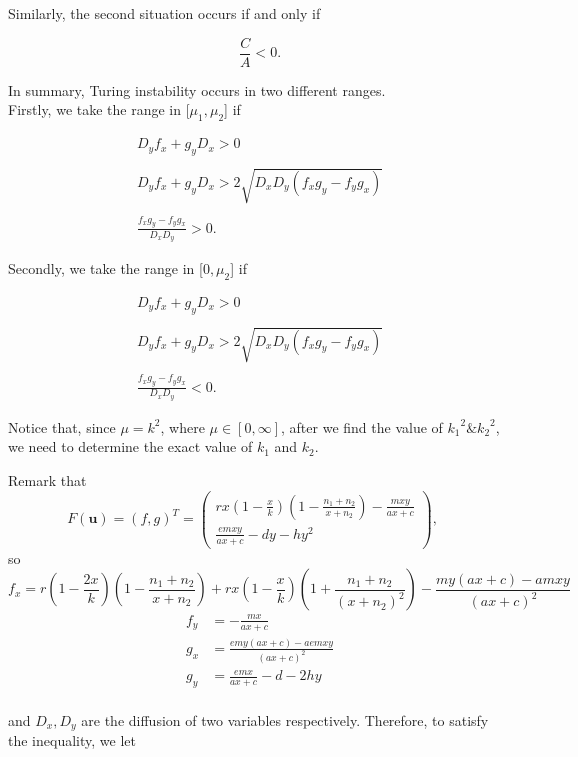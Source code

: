 \documentclass[12pt]{article}
\begin{document}
\noindent Similarly, the second situation occurs if and only if

$$\dfrac{C}{A}<0.
$$
\vspace{12pt}

\noindent In summary, Turing instability occurs in two different ranges.\\
Firstly, we take the range in [$\mu_1,\mu_2$] if
\vspace{12pt}

$$
\begin{array}{c}D_y f_x+g_y D_x>0\\ \\ D_y f_x +g_y D_x>2\sqrt{D_x D_y(f_x g_y-f_y g_x)}\\ \\ \frac{f_x g_y -f_y g_x}{D_x D_y}>0.\end{array}
$$
\vspace{12pt}

\noindent Secondly, we take the range in [$0,\mu_2$] if

$$
\begin{array}{c}D_y f_x+g_y D_x>0\\ \\ D_y f_x +g_y D_x>2\sqrt{D_x D_y(f_x g_y-f_y g_x)}\\ \\ \frac{f_x g_y -f_y g_x}{D_x D_y}<0.\end{array}
$$
\vspace{12pt}

\noindent Notice that, since $\mu = k^2$, where $\mu\in[0,\infty]$, after we find the value of ${k_1}^2\&{k_2}^2$, we need to determine the exact value of $k_1$ and $k_2$.
\vspace{12pt}

\noindent Remark that
$$
F(\boldsymbol{u})=(f,g)^T=\begin{pmatrix}rx\left(1-\frac{x}{k}\right)\left(1-\frac{n_1+n_2}{x+n_2}\right)-\frac{mxy}{ax+c}\\ \frac{emxy}{ax+c}-dy-hy^2\end{pmatrix},\quad
$$
so
$$
f_x=r\left(1-\dfrac{2x}{k}\right)\left(1-\dfrac{{n_1+n_2}}{{x+n_2}}\right)+rx\left({1-\dfrac{x}{k}}\right)\left({1+\dfrac{n_1+n_2}{(x+n_2)^2}}\right)-\dfrac{my(ax+c)-amxy}{(ax+c)^2}\quad
$$
\vspace{12pt}
$$
\begin{aligned}f_y&=-\frac{mx}{ax+c}\\ g_x&=\frac{emy(ax+c)-aemxy}{(ax+c)^2}\\ g_y&=\frac{emx}{ax+c}-d-2hy\end{aligned}
$$
\vspace{12pt}\\
\noindent and $D_x, D_y$ are the diffusion of two variables respectively. Therefore, to satisfy the inequality, we let
\vspace{12pt}
\end{document}
